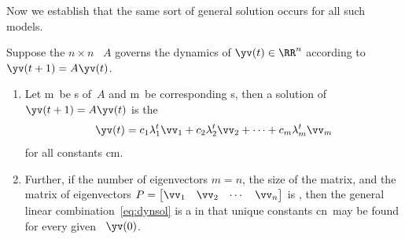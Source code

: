 Now we establish that the same sort of general solution occurs for all such models.


\begin{theorem} \label{thm:dynsol}
Suppose the \(n\times n\) ~\(A\) governs the dynamics of \(\yv(t)\in\RR^n\) according to \(\yv(t+1)=A\yv(t)\).
\begin{enumerate}
\item\label{thm:dynsola} Let \hlist\lambda m\ be s of~\(A\) and \hlist\vv m\ be corresponding s, then a solution of \(\yv(t+1)=A\yv(t)\) is the 
\begin{equation}
\yv(t)=c_1\lambda_1^t\vv_1+c_2\lambda_2^t\vv_2+\cdots+c_m\lambda_m^t\vv_m
\label{eq:dynsol}
\end{equation}
for all constants \hlist cm.

\sloppy
\item\label{thm:dynsolb} Further, if the number of eigenvectors \(m=n\), the size of the matrix, and the matrix of eigenvectors \(P=\begin{bmatrix} \vv_1&\vv_2&\cdots&\vv_n \end{bmatrix}\) is , then the general linear combination~\eqref{eq:dynsol} is a  in that unique constants \hlist cn\ may be found for every given ~\(\yv(0)\).
\end{enumerate}
\end{theorem}

